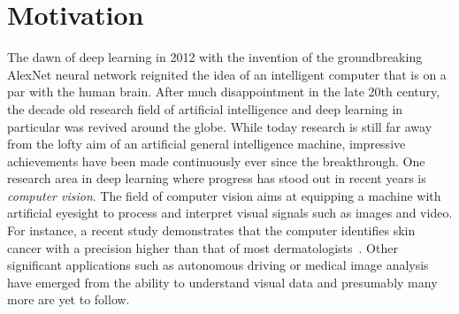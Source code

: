 \documentclass[a4paper,12pt]{report}
\begin{document}
\section{Motivation}
The dawn of deep learning in 2012 with the invention of the groundbreaking AlexNet neural network reignited the idea of an intelligent computer that is on a par with the human brain. After much disappointment in the late 20th century, the decade old research field of artificial intelligence and deep learning in particular was revived around the globe. While today research is still far away from the lofty aim of an artificial general intelligence machine, impressive achievements have been made continuously ever since the breakthrough. One research area in deep learning where progress has stood out in recent years is \textit{computer vision}. The field of computer vision aims at equipping a machine with artificial eyesight to process and interpret visual signals such as images and video. For instance, a recent study demonstrates that the computer identifies skin cancer with a precision higher than that of most dermatologists~\cite{MelanomaCNN}. Other significant applications such as autonomous driving or medical image analysis have emerged from the ability to understand visual data and presumably many more are yet to follow. 
\end{document}
